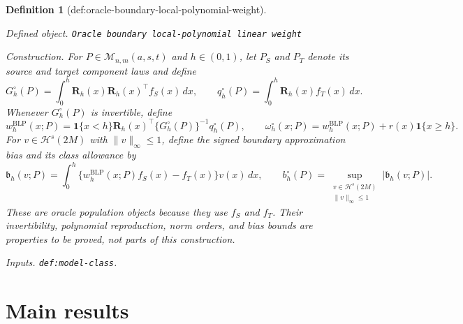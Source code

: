 \documentclass{article}
\newtheorem{definition}{Definition}
\begin{document}
\begin{definition}[def:oracle-boundary-local-polynomial-weight]\label{def:oracle-boundary-local-polynomial-weight}
\par\smallskip\noindent\emph{Defined object.} \texttt{Oracle boundary local-\allowbreak{}polynomial linear weight}
\par\smallskip\noindent\emph{Construction.} For \(P\in\mathcal M_{n,m}(a,s,t)\) and \(h\in(0,1)\), let \(P_S\) and \(P_T\) denote its source and target component laws and define
\[
G_h^{\circ}(P)=\int_0^h\mathbf R_h(x)\mathbf R_h(x)^\top f_S(x)\,dx,
\qquad
q_h^{\circ}(P)=\int_0^h\mathbf R_h(x)f_T(x)\,dx.
\]
Whenever \(G_h^{\circ}(P)\) is invertible, define
\[
w_h^{\mathrm{BLP}}(x;P)=\mathbf 1\{x<h\}\mathbf R_h(x)^\top
\{G_h^{\circ}(P)\}^{-1}q_h^{\circ}(P),
\qquad
\omega_h^{\circ}(x;P)=w_h^{\mathrm{BLP}}(x;P)+r(x)\mathbf 1\{x\ge h\}.
\]
For \(v\in\mathcal H^s(2M)\) with \(\|v\|_\infty\le1\), define the signed boundary approximation bias and its class allowance by
\[
\mathfrak b_h(v;P)=\int_0^h\{w_h^{\mathrm{BLP}}(x;P)f_S(x)-f_T(x)\}v(x)\,dx,
\qquad
b_h^{\circ}(P)=\sup_{\substack{v\in\mathcal H^s(2M)\\\|v\|_\infty\le1}}|\mathfrak b_h(v;P)|.
\]
These are oracle population objects because they use \(f_S\) and \(f_T\). Their invertibility, polynomial reproduction, norm orders, and bias bounds are properties to be proved, not parts of this construction.
\par\smallskip\noindent\emph{Inputs.} \texttt{def:\allowbreak{}model-\allowbreak{}class}.
\end{definition}

\section{Main results}
\end{document}
